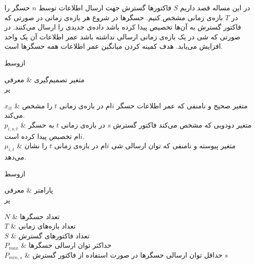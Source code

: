

در این مساله قصد داریم $S$ فاکتورها گسترش جهت ارسال اطلاعات توسط $n$ حسگر را در $T$ بازه‌ی زمانی مشخص کنیم.
حسگرها در شروع هر بازه‌ی زمانی در صورتی که فاکتور گسترش به آن‌ها تخصیص پیدا کرده باشد داده‌ی جدیدی را ارسال می‌کنند.
در صورتی که شی در یک بازه‌ی زمانی ارسالی نداشته باشد عمر اطلاعات آن یک واحد افزایش می‌یابد.
هدف کمینه کردن میانگین عمر اطلاعات همه حسگر‌ها است.


‌ازوسط



متغیر تصمیم‌گیری & معرفی \\

‌پر

$x_{it}$ & متغیر صحیح و نامنفی که عمر اطلاعات حسگر $i$ام در بازه‌ی زمانی $t$ را مشخص می‌کند. \\

$p_{i,s,t}$ & متغیر دودویی که مشخص می‌کند فاکتور گسترش $s$ در بازه‌ی زمانی $t$ به حسگر $i$ام تخصیص پیدا کرده است. \\

$\mu_{i,t}$ & متغیر پیوسته و نامنفی که توان ارسالی شی $i$ام در بازه‌ی زمانی $t$ را نشان می‌دهد. \\





‌ازوسط



پارامتر & معرفی \\

‌پر

$N$ & تعداد حسگرها \\

$T$ & تعداد بازه‌های زمانی \\

$S$ & تعداد فاکتورهای گسترش \\

$P_{max}$ & حداکثر توان ارسالی حسگرها \\

$P_{min, s}$ & حداقل توان ارسالی حسگرها در صورت استفاده از فاکتور گسترش $s$ \\

